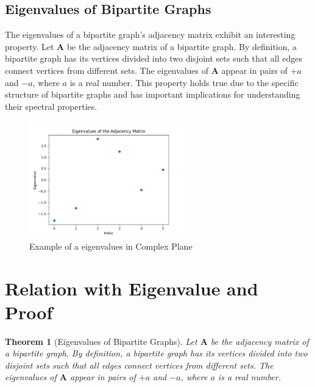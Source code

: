 \documentclass{article}
\newtheorem{theorem}{Theorem}
\newcommand{\mat}[1]{\mathbf{#1}}
\begin{document}
\subsection{Eigenvalues of Bipartite Graphs}
The eigenvalues of a bipartite graph's adjacency matrix exhibit an interesting property. Let $\mat{A}$ be the adjacency matrix of a bipartite graph. By definition, a bipartite graph has its vertices divided into two disjoint sets such that all edges connect vertices from different sets. The eigenvalues of $\mat{A}$ appear in pairs of $+a$ and $-a$, where $a$ is a real number. This property holds true due to the specific structure of bipartite graphs and has important implications for understanding their spectral properties.

\begin{figure}[h]
    \centering
    \includegraphics[width=0.6\textwidth]{Eigenvalues.png}
    \caption{Example of a eigenvalues in Complex Plane}
    \label{fig:Eigenvalues}
    \end{figure}
    

\section{Relation with Eigenvalue and Proof}
\begin{theorem}[Eigenvalues of Bipartite Graphs]
Let $\mat{A}$ be the adjacency matrix of a bipartite graph. By definition, a bipartite graph has its vertices divided into two disjoint sets such that all edges connect vertices from different sets. The eigenvalues of $\mat{A}$ appear in pairs of $+a$ and $-a$, where $a$ is a real number.
\end{theorem}
\end{document}

